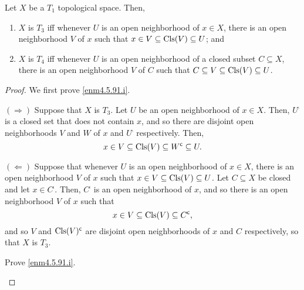 \begin{prp}\label{prp4.5.91}
Let $X$ be a $T_1$ topological space.  Then,
\begin{enumerate}
\item \label{enm4.5.91.i}$X$ is $T_3$ iff whenever $U$ is an open neighborhood of $x\in X$, there is an open neighborhood $V$ of $x$ such that $x\in V\subseteq \operatorname{Cls} (V)\subseteq U$; and
\item \label{enm4.5.91.ii}$X$ is $T_4$ iff whenever $U$ is an open neighborhood of a closed subset $C\subseteq X$, there is an open neighborhood $V$ of $C$ such that $C\subseteq V\subseteq \operatorname{Cls} (V)\subseteq U$.
\end{enumerate}
\begin{proof}
We first prove \ref{enm4.5.91.i}.

$(\Rightarrow )$ Suppose that $X$ is $T_3$.  Let $U$ be an open neighborhood of $x\in X$.  Then, $U^{\comp}$ is a closed set that does not contain $x$, and so there are disjoint open neighborhoods $V$ and $W$ of $x$ and $U^{\comp}$ respectively.  Then,
\begin{equation}
x\in V\subseteq \operatorname{Cls} (V)\subseteq W^{\mathsf{c}}\subseteq U.
\end{equation}

\blankline
\noindent
$(\Leftarrow )$ Suppose that whenever $U$ is an open neighborhood of $x\in X$, there is an open neighborhood $V$ of $x$ such that $x\in V\subseteq \operatorname{Cls} (V)\subseteq U$.  Let $C\subseteq X$ be closed and let $x\in C^{\comp}$.  Then, $C^{\comp}$ is an open neighborhood of $x$, and so there is an open neighborhood $V$ of $x$ such that
\begin{equation}
x\in V\subseteq \operatorname{Cls} (V)\subseteq C^{\mathsf{c}},
\end{equation}
and so $V$ and $\operatorname{Cls} (V)^{\mathsf{c}}$ are disjoint open neighborhoods of $x$ and $C$ respectively, so that $X$ is $T_3$.
\begin{exr}
Prove \ref{enm4.5.91.i}.
\end{exr}
\end{proof}
\end{prp}
